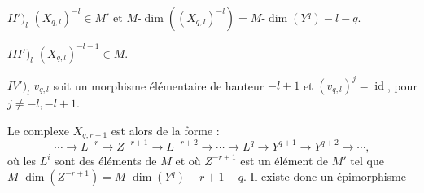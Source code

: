 \noindent$II')_l$
$(X_{q,l})^{-l}\in M'$ et
$M\text{-}\dim((X_{q,l})^{-l})=M\text{-}\dim(Y^q)-l-q$.

\noindent$III')_l$
$(X_{q,l})^{-l+1}\in M$.

\noindent$IV')_l$
$v_{q,l}$ soit un morphisme élémentaire de hauteur $-l+1$ et
$(v_{q,l})^j=\operatorname{id}$, pour $j\neq-l,-l+1$.

Le complexe $X_{q,r-1}$ est alors de la forme :
\[
\cdots\longrightarrow L^{-r}\longrightarrow Z^{-r+1}
\longrightarrow L^{-r+2}\longrightarrow\cdots\longrightarrow L^q
\longrightarrow Y^{q+1}\longrightarrow Y^{q+2}\longrightarrow\cdots,
\]
où les $L^i$ sont des éléments de $M$ et où $Z^{-r+1}$ est un élément de
$M'$ tel que
$M\text{-}\dim(Z^{-r+1})=M\text{-}\dim(Y^q)-r+1-q$. Il existe donc un
épimorphisme
\endgroup

